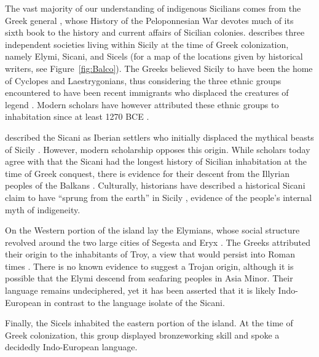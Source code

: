 \documentclass{../../../coursework}
\begin{document}
The vast majority of our understanding of indigenous Sicilians comes from the
Greek general \citeauthor{Thucydides}, whose History of the Peloponnesian War
devotes much of its sixth book to the history and current affairs of Sicilian
colonies. \citeauthor{Thucydides} describes three independent societies living
within Sicily at the time of Greek colonization, namely Elymi, Sicani, and
Sicels (for a map of the locations given by historical writers, see
Figure~\ref{fig:Balco}). The Greeks believed Sicily to have been the home of
Cyclopes and Laestrygonians, thus considering the three ethnic groups
encountered to have been recent immigrants who displaced the creatures of
legend \parencite[VI.2]{Thucydides}. Modern scholars have however attributed
these ethnic groups to inhabitation since at least 1270 BCE \parencite{Lei99}.

\citeauthor{Thucydides} described the Sicani as Iberian settlers who initially
displaced the mythical beasts of Sicily \parencite[VI.2]{Thucydides}. However,
modern scholarship opposes this origin. While scholars today agree with
\citeauthor{Thucydides} that the Sicani had the longest history of Sicilian
inhabitation at the time of Greek conquest, there is evidence for their
descent from the Illyrian peoples of the Balkans \parencite{Fin83}.
Culturally, historians have described a historical Sicani claim to have
``sprung from the earth'' in Sicily \parencite[12]{Fre92}, evidence of the
people's internal myth of indigeneity.

On the Western portion of the island lay the Elymians, whose social structure
revolved around the two large cities of Segesta and Eryx
\parencite[VI.2]{Thucydides}. The Greeks attributed their origin to the
inhabitants of Troy, a view that would persist into Roman times
\parencite{Fre92}. There is no known evidence to suggest a Trojan origin,
although it is possible that the Elymi descend from seafaring peoples in Asia
Minor. Their language remains undeciphered, yet it has been asserted that it
is likely Indo-European \parencite{Mar12} in contrast to the language isolate
of the Sicani.

Finally, the Sicels inhabited the eastern portion of the island. At the time
of Greek colonization, this group displayed bronzeworking skill and spoke a
decidedly Indo-European language.
\end{document}
